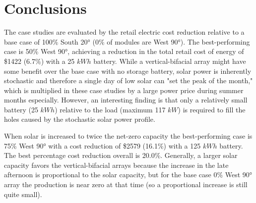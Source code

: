 \documentclass[conference]{IEEEtran}
\begin{document}
\section{Conclusions}


The case studies are evaluated by the retail electric cost reduction relative to a base case of 100\% South 20° (0\% of modules are West 90°). The best-performing case is 50\% West 90°, achieving a reduction in the total retail cost of energy of \$1422 (6.7\%) with a 25 $kWh$ battery. While a vertical-bifacial array might have some benefit over the base case with no storage battery, solar power is inherently stochastic and therefore a single day of low solar can "set the peak of the month," which is multiplied in these case studies by a large power price during summer months especially. However, an interesting finding is that only a relatively small battery (25 $kWh$) relative to the load (maximum 117 $kW$) is required to fill the holes caused by the stochastic solar power profile. 

When solar is increased to twice the net-zero capacity the best-performing case is 75\% West 90° with a cost reduction of \$2579 (16.1\%) with a 125 $kWh$ battery. The best percentage cost reduction overall is 20.0\%. Generally, a larger solar capacity favors the vertical-bifacial arrays because the increase in the late afternoon is proportional to the solar capacity, but for the base case 0\% West 90° array the production is near zero at that time (so a proportional increase is still quite small). 
\end{document}
